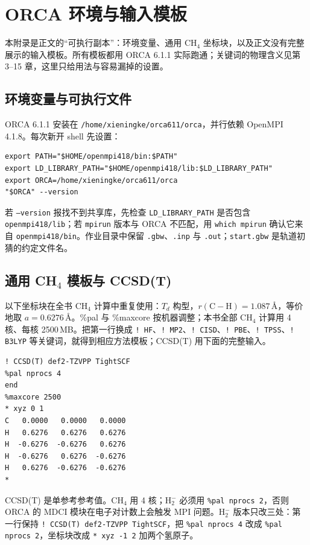 
\section{ORCA 环境与输入模板}
\label{app:orca}
\lstset{basicstyle=\ttfamily\footnotesize}

本附录是正文的“可执行副本”：环境变量、通用 CH$_4$ 坐标块，以及正文没有完整展示的输入模板。所有模板都用 ORCA 6.1.1\citep{neese2020orca} 实际跑通；关键词的物理含义见第 3--15 章，这里只给用法与容易漏掉的设置。

\subsection{环境变量与可执行文件}

ORCA 6.1.1 安装在 \texttt{/home/xieningke/orca611/orca}，并行依赖 OpenMPI 4.1.8。每次新开 shell 先设置：
\begin{lstlisting}
export PATH="$HOME/openmpi418/bin:$PATH"
export LD_LIBRARY_PATH="$HOME/openmpi418/lib:$LD_LIBRARY_PATH"
export ORCA=/home/xieningke/orca611/orca
"$ORCA" --version
\end{lstlisting}
若 \texttt{--version} 报找不到共享库，先检查 \texttt{LD\_LIBRARY\_PATH} 是否包含 \texttt{openmpi418/lib}；若 \texttt{mpirun} 版本与 ORCA 不匹配，用 \texttt{which mpirun} 确认它来自 \texttt{openmpi418/bin}。作业目录中保留 \texttt{.gbw}、\texttt{.inp} 与 \texttt{.out}；\texttt{start.gbw} 是轨道初猜的约定文件名。

\subsection{通用 CH$_4$ 模板与 CCSD(T)}

以下坐标块在全书 CH$_4$ 计算中重复使用：$T_d$ 构型，$r(\mathrm{C\!-\!H})=1.087$\,\AA，等价地取 $a=0.6276$\,\AA。\%pal 与 \%maxcore 按机器调整；本书全部 CH$_4$ 计算用 4 核、每核 2500\,MB。把第一行换成 \texttt{! HF}、\texttt{! MP2}、\texttt{! CISD}、\texttt{! PBE}、\texttt{! TPSS}、\texttt{! B3LYP} 等关键词，就得到相应方法模板；CCSD(T) 用下面的完整输入。
\begin{lstlisting}
! CCSD(T) def2-TZVPP TightSCF
%pal nprocs 4
end
%maxcore 2500
* xyz 0 1
C   0.0000   0.0000   0.0000
H   0.6276   0.6276   0.6276
H  -0.6276  -0.6276   0.6276
H  -0.6276   0.6276  -0.6276
H   0.6276  -0.6276  -0.6276
*
\end{lstlisting}
CCSD(T) 是单参考参考值。CH$_4$ 用 4 核；H$_2^-$ 必须用 \texttt{\%pal nprocs 2}，否则 ORCA 的 MDCI 模块在电子对计数上会触发 MPI 问题。H$_2^-$ 版本只改三处：第一行保持 \texttt{! CCSD(T) def2-TZVPP TightSCF}，把 \texttt{\%pal nprocs 4} 改成 \texttt{\%pal nprocs 2}，坐标块改成 \texttt{* xyz -1 2} 加两个氢原子。

